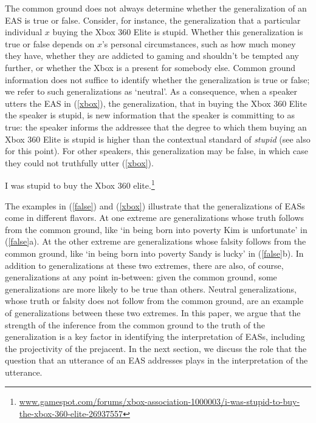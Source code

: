 \documentclass[11pt,fleqn]{article}
\newcommand{\6}{\mbox{$[\hspace*{-.6mm}[$}}
\newcommand{\9}{\mbox{$]\hspace*{-.6mm}]$}}
\begin{document}
The common ground does not always determine whether the generalization of an EAS is true or false. Consider, for instance, the generalization that a particular individual $x$ buying the Xbox 360 Elite is stupid. Whether this generalization is true or false depends on $x$'s personal circumstances, such as how much money they have, whether they are addicted to gaming and shouldn't be tempted any further, or whether the Xbox is a present for somebody else. Common ground information does not suffice to identify whether the generalization is true or false; we refer to such generalizations as `neutral'. As a consequence, when a speaker utters the EAS in (\ref{xbox}), the generalization, that in buying the Xbox 360 Elite the speaker is stupid, is new information that the speaker is committing to as true: the speaker informs the addressee that the degree to which them buying an Xbox 360 Elite is stupid is higher than the contextual standard of {\em stupid} (see also \citealt{barker02} for this point). For other speakers, this generalization may be false, in which case they could not truthfully utter (\ref{xbox}).

\begin{exe}
\ex\label{xbox} I was stupid to buy the Xbox 360 elite.\footnote{\url{www.gamespot.com/forums/xbox-association-1000003/i-was-stupid-to-buy-the-xbox-360-elite-26937557}}
\end{exe}

The examples in (\ref{false}) and (\ref{xbox}) illustrate that the generalizations of EASs come in different flavors. At one extreme are generalizations whose truth follows from the common ground, like `in being born into poverty Kim is unfortunate' in (\ref{false}a). At the other extreme are generalizations whose falsity follows from the common ground, like `in being born into poverty Sandy is lucky' in (\ref{false}b). In addition to generalizations at these two extremes, there are also, of course, generalizations at any point in-between: given the common ground, some generalizations are more likely to be true than others. Neutral generalizations, whose truth or falsity does not follow from the common ground, are an example of generalizations between these two extremes. In this paper, we argue that the strength of the inference from the common ground to the truth of the generalization is a key factor in identifying the interpretation of EASs, including the projectivity of the prejacent. In the next section, we discuss the role that the question that an utterance of an EAS addresses plays in the interpretation of the utterance.
\end{document}
